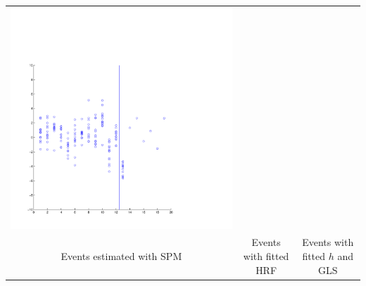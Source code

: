 \documentclass{beamer}
\begin{document}
\begin{frame}
\begin{tabular}{ccc}
\includegraphics[scale=0.15]{ex2_data2.pdf}\\
Events estimated with SPM & Events with fitted HRF & Events with fitted $h$ and GLS
\end{tabular}
\end{frame}
\end{document}
